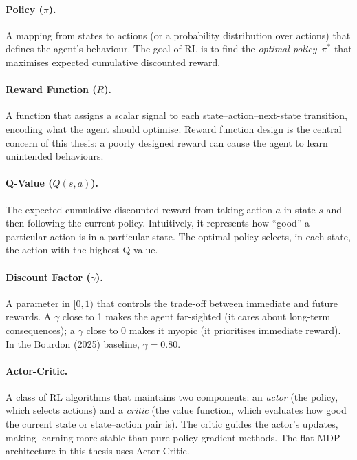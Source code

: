 \documentclass[12pt,a4paper]{article}
\begin{document}
\paragraph{Policy ($\pi$).}
A mapping from states to actions (or a probability distribution over actions) that defines the agent's behaviour. The goal of RL is to find the \emph{optimal policy}~$\pi^*$ that maximises expected cumulative discounted reward.

\paragraph{Reward Function ($R$).}
A function that assigns a scalar signal to each state--action--next-state transition, encoding what the agent should optimise. Reward function design is the central concern of this thesis: a poorly designed reward can cause the agent to learn unintended behaviours.

\paragraph{Q-Value ($Q(s, a)$).}
The expected cumulative discounted reward from taking action $a$ in state $s$ and then following the current policy. Intuitively, it represents how ``good'' a particular action is in a particular state. The optimal policy selects, in each state, the action with the highest Q-value.

\paragraph{Discount Factor ($\gamma$).}
A parameter in $[0, 1)$ that controls the trade-off between immediate and future rewards. A $\gamma$ close to 1 makes the agent far-sighted (it cares about long-term consequences); a $\gamma$ close to 0 makes it myopic (it prioritises immediate reward). In the Bourdon (2025) baseline, $\gamma = 0.80$.

\paragraph{Actor-Critic.}
A class of RL algorithms that maintains two components: an \emph{actor} (the policy, which selects actions) and a \emph{critic} (the value function, which evaluates how good the current state or state--action pair is). The critic guides the actor's updates, making learning more stable than pure policy-gradient methods. The flat MDP architecture in this thesis uses Actor-Critic.
\end{document}
